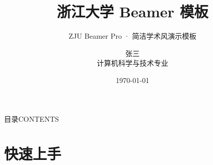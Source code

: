 \documentclass[10pt,aspectratio=169]{beamer}
\title{浙江大学 Beamer 模板}
\subtitle{ZJU Beamer Pro · 简洁学术风演示模板}
\author{张三\\[1mm]{\footnotesize 计算机科学与技术专业}}
\institute{浙江大学计算机科学与技术学院}
\date{\today}
\begin{document}
\begin{frame}[plain]
  \titlepage
\end{frame}

\begin{frame}{目录}{CONTENTS}
  \vspace{2mm}
  \begin{minipage}[t]{0.48\textwidth}
    \vspace{0pt}%
    \tableofcontents[sections={1-2}]
  \end{minipage}\hfill
  \begin{minipage}[t]{0.48\textwidth}
    \vspace{0pt}%
    \tableofcontents[sections={3-4}]
  \end{minipage}
\end{frame}

\section{快速上手}
\end{document}

